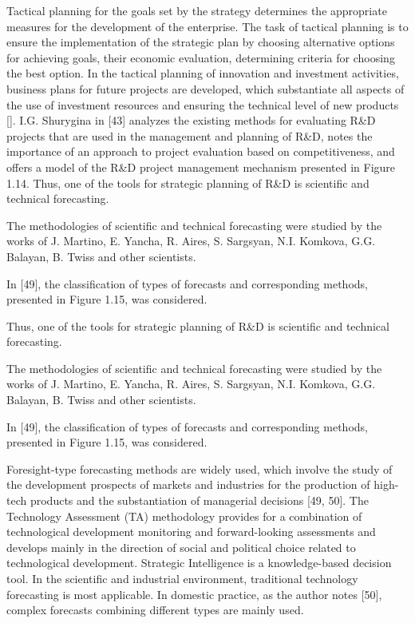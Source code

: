 \documentclass[12pt,twoside]{reedthesis}
\begin{document}
Tactical planning for the goals set by the strategy determines the appropriate measures for the development of the enterprise. The task of tactical planning is to ensure the implementation of the strategic plan by choosing alternative options for achieving goals, their economic evaluation, determining criteria for choosing the best option. In the tactical planning of innovation and investment activities, business plans for future projects are developed, which substantiate all aspects of the use of investment resources and ensuring the technical level of new products {[}{]}. I.G. Shurygina in {[}43{]} analyzes the existing methods for evaluating R\&D projects that are used in the management and planning of R\&D, notes the importance of an approach to project evaluation based on competitiveness, and offers a model of the R\&D project management mechanism presented in Figure 1.14. Thus, one of the tools for strategic planning of R\&D is scientific and technical forecasting.

The methodologies of scientific and technical forecasting were studied by the works of J. Martino, E. Yancha, R. Aires, S. Sargsyan, N.I. Komkova, G.G. Balayan, B. Twiss and other scientists.

In {[}49{]}, the classification of types of forecasts and corresponding methods, presented in Figure 1.15, was considered.

Thus, one of the tools for strategic planning of R\&D is scientific and technical forecasting.

The methodologies of scientific and technical forecasting were studied by the works of J. Martino, E. Yancha, R. Aires, S. Sargsyan, N.I. Komkova, G.G. Balayan, B. Twiss and other scientists.

In {[}49{]}, the classification of types of forecasts and corresponding methods, presented in Figure 1.15, was considered.

Foresight-type forecasting methods are widely used, which involve the study of the development prospects of markets and industries for the production of high-tech products and the substantiation of managerial decisions {[}49, 50{]}. The Technology Assessment (TA) methodology provides for a combination of technological development monitoring and forward-looking assessments and develops mainly in the direction of social and political choice related to technological development.
Strategic Intelligence is a knowledge-based decision tool. In the scientific and industrial environment, traditional technology forecasting is most applicable. In domestic practice, as the author notes {[}50{]}, complex forecasts combining different types are mainly used.
\end{document}
